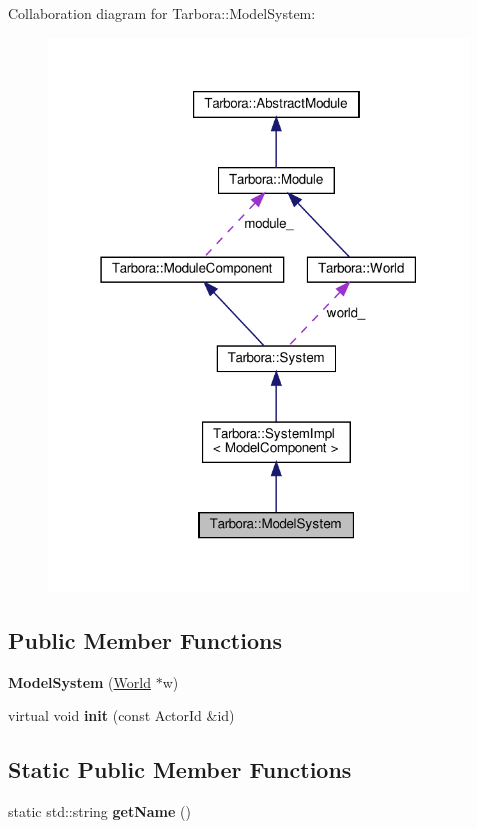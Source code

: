 Collaboration diagram for Tarbora\+:\+:Model\+System\+:\nopagebreak
\begin{figure}[H]
\begin{center}
\leavevmode
\includegraphics[width=316pt]{classTarbora_1_1ModelSystem__coll__graph}
\end{center}
\end{figure}
\subsection*{Public Member Functions}
\begin{DoxyCompactItemize}
\item 
\mbox{\label{classTarbora_1_1ModelSystem_a086930e214d0377513654cf7d3f62c74}} 
{\bfseries Model\+System} (\hyperlink{classTarbora_1_1World}{World} $\ast$w)
\item 
\mbox{\label{classTarbora_1_1ModelSystem_a159b197bea623e2da1af73d9d8ccc619}} 
virtual void {\bfseries init} (const Actor\+Id \&id)
\end{DoxyCompactItemize}
\subsection*{Static Public Member Functions}
\begin{DoxyCompactItemize}
\item 
\mbox{\label{classTarbora_1_1ModelSystem_a6401e917f9195df0a0ea7860ad4ac815}} 
static std\+::string {\bfseries get\+Name} ()
\end{DoxyCompactItemize}
